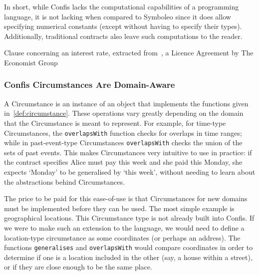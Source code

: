 In short, while Confis lacks the computational capabilities of a programming language, it is not lacking when compared to Symboleo since it does allow specifying numerical constants (except without having to specify their types).
Additionally, traditional contracts also leave such computations to the reader.

\begin{table}[h]
    \centering
    \setlength{\fboxsep}{10pt}
    \caption[The Econoimist licence interest rate clause]{Clause concerning an interest rate, extracted from~\cite{economistIU2016licence}, a Licence Agreement by The Economist Group}
    \label{tab:economist-interest}
\end{table}

\subsubsection{Confis Circumstances Are Domain-Aware}
\label{subsubsec:limits-domain-circumstances}

A Circumstance is an instance of an object that implements the functions given in~\autoref{def:circumstance}.
These operations vary greatly depending on the domain that the Circumstance is meant to represent.
For example, for time-type Circumstances, the \texttt{overlapsWith} function checks for overlaps in time ranges;
while in past-event-type Circumstances \texttt{overlapsWith} checks the union of the sets of past events.
This makes Circumstances very intuitive to use in practice: if the contract specifies Alice must pay this week and she paid this Monday, she expects `Monday' to be generalised by `this week', without needing to learn about the abstractions behind Circumstances.


The price to be paid for this ease-of-use is that Circumstances for new domains must be implemented before they can be used.
The most simple example is geographical locations.
This Circumstance type is not already built into Confis.
If we were to make such an extension to the language, we would need to define a location-type circumstance as some coordinates (or perhaps an address).
The functions \texttt{generalises} and \texttt{overlapsWith} would compare coordinates in order to determine if one is a location included in the other (say, a house within a street), or if they are close enough to be the same place.

